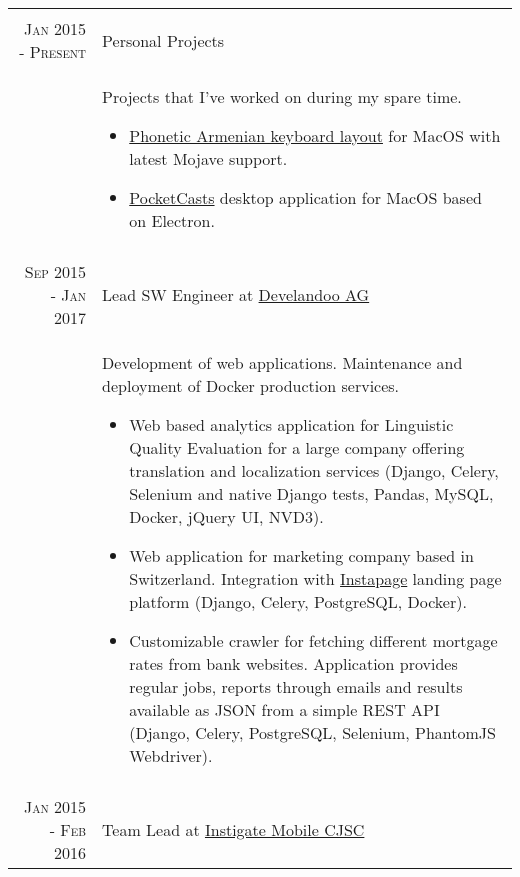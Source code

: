\documentclass[a4paper,10pt]{article}
\begin{document}
\begin{tabular}{r|p{11cm}}
\multicolumn{2}{c}{} \\


\textsc{Jan 2015 - Present}
  & Personal Projects \\
  & \footnotesize{
    Projects that I've worked on during my spare time.
    \begin{itemize}
      \item \href{https://github.com/vahe-evoyan/armenian-phonetic/releases}
        {Phonetic Armenian keyboard layout} for MacOS with latest Mojave
        support.
      \item \href{https://vahe-evoyan.github.io/pocketcasts-desktop/}
        {PocketCasts} desktop application for MacOS based on Electron.
    \end{itemize}
  } \\


\multicolumn{2}{c}{} \\


\textsc{Sep 2015 - Jan 2017}
  & Lead SW Engineer at
    \href{http://www.develandoo.com/}{Develandoo AG} \\

& \footnotesize{ Development of web applications. Maintenance and deployment
of Docker production services.
  \begin{itemize}
    \item Web based analytics application for Linguistic Quality Evaluation
    for a large company offering translation and localization services
    (Django, Celery, Selenium and native Django tests, Pandas, MySQL, Docker,
    jQuery UI, NVD3).
    \item Web application for marketing company based in Switzerland.
    Integration with \href{https://instapage.com/}{Instapage} landing page
    platform (Django, Celery, PostgreSQL, Docker).
    \item Customizable crawler for fetching different mortgage rates from bank
    websites. Application provides regular jobs, reports through emails and
    results available as JSON from a simple REST API (Django, Celery,
    PostgreSQL, Selenium, PhantomJS Webdriver).
  \end{itemize}
} \\


\multicolumn{2}{c}{} \\


\textsc{Jan 2015 - Feb 2016}
  & Team Lead at
    \href{http://www.instigatemobile.com/}{Instigate Mobile CJSC} \\


\end{tabular}
\end{document}
